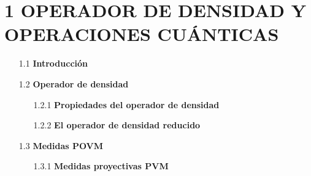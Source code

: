\documentclass[12pt,oneside]{book}\raggedbottom{} %
\begin{document}
\begin{sloppypar}
{{\section*{1 OPERADOR DE DENSIDAD Y OPERACIONES CUÁNTICAS}
\begin{itemize}
\item[1.1]\textbf{Introducción}




\item[1.2] \textbf{Operador de densidad}

\begin{itemize}
  \item[1.2.1] \textbf{Propiedades del operador de densidad} 
  
  \item[1.2.2] \textbf{El operador de densidad reducido} 
  

\end{itemize}
\item[1.3] \textbf{Medidas POVM} 
\begin{itemize}
  \item[1.3.1]\textbf{Medidas proyectivas PVM}
  

\end{itemize}
\end{itemize}}}
\end{sloppypar}
\end{document}
